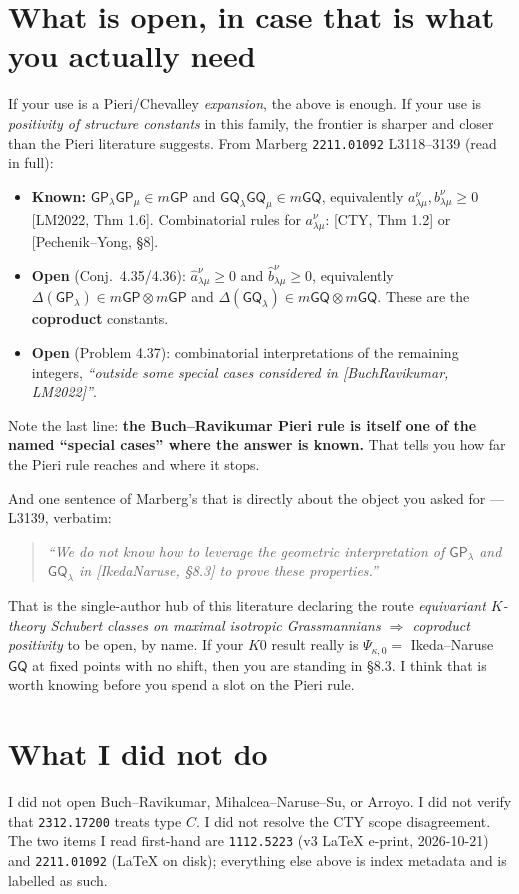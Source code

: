 \documentclass[11pt]{article}
\newcommand{\GP}{\mathsf{GP}}
\newcommand{\GQ}{\mathsf{GQ}}
\begin{document}
\section{What is open, in case that is what you actually need}

If your use is a Pieri/Chevalley \emph{expansion}, the above is enough. If your use is
\emph{positivity of structure constants} in this family, the frontier is sharper and
closer than the Pieri literature suggests. From Marberg \texttt{2211.01092}
L3118--3139 (read in full):

\begin{itemize}
\item \textbf{Known:} $\GP_\lambda \GP_\mu \in m\GP$ and $\GQ_\lambda \GQ_\mu \in
m\GQ$, equivalently $a^\nu_{\lambda\mu}, b^\nu_{\lambda\mu} \ge 0$
[LM2022, Thm 1.6]. Combinatorial rules for $a^\nu_{\lambda\mu}$: [CTY, Thm 1.2] or
[Pechenik--Yong, \S8].
\item \textbf{Open} (Conj.\ 4.35/4.36): $\hat a^\nu_{\lambda\mu} \ge 0$ and
$\hat b^\nu_{\lambda\mu} \ge 0$, equivalently $\Delta(\GP_\lambda) \in m\GP \otimes
m\GP$ and $\Delta(\GQ_\lambda) \in m\GQ \otimes m\GQ$. These are the
\textbf{coproduct} constants.
\item \textbf{Open} (Problem 4.37): combinatorial interpretations of the remaining
integers, \emph{``outside some special cases considered in [BuchRavikumar, LM2022]''}.
\end{itemize}

Note the last line: \textbf{the Buch--Ravikumar Pieri rule is itself one of the named
``special cases'' where the answer is known.} That tells you how far the Pieri rule
reaches and where it stops.

And one sentence of Marberg's that is directly about the object you asked for ---
L3139, verbatim:

\begin{quote}
\emph{``We do not know how to leverage the geometric interpretation of $\GP_\lambda$
and $\GQ_\lambda$ in [IkedaNaruse, \S8.3] to prove these properties.''}
\end{quote}

That is the single-author hub of this literature declaring the route
\emph{equivariant $K$-theory Schubert classes on maximal isotropic Grassmannians
$\Rightarrow$ coproduct positivity} to be open, by name. If your $K0$ result really is
$\Psi_{\kappa,0} = $ Ikeda--Naruse $\GQ$ at fixed points with no shift, then you are
standing in \S8.3. I think that is worth knowing before you spend a slot on the Pieri
rule.

\section{What I did not do}

I did not open Buch--Ravikumar, Mihalcea--Naruse--Su, or Arroyo. I did not verify that
\texttt{2312.17200} treats type $C$. I did not resolve the CTY scope disagreement. The
two items I read first-hand are \texttt{1112.5223} (v3 LaTeX e-print, 2026-10-21) and
\texttt{2211.01092} (LaTeX on disk); everything else above is index metadata and is
labelled as such.
\end{document}
